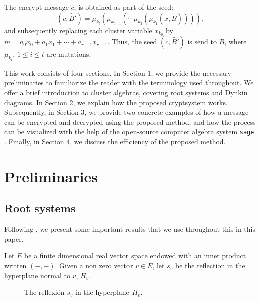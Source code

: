 \documentclass[12pt,a4paper]{article}
\begin{document}
The encrypt message $\tilde{c}$, is obtained as part of the seed:
$$(\tilde{c},\tilde{B'})=\mu_{k_{t}}(\mu_{k_{t-1}}(\cdots \mu_{k_2}(\mu_{k_1}(\tilde{x},\tilde{B})))),$$ and subsequently replacing each cluster variable $x_{k_0}$ by $m= a_0x_0+a_1x_1 + \cdots + a_{r-1}x_{r-1}$. Thus, the seed $(\tilde{c},\tilde{B'})$ is send to $B$, where $\mu_{k_i}$, $1\le i\le t$ are mutations.



This work consists of four sections. In Section 1, we provide the necessary preliminaries to familiarize the reader with the terminology used throughout. We offer a brief introduction to cluster algebras, covering root systems and Dynkin diagrams. In Section 2, we explain how the proposed cryptsystem works. Subsequently, in Section 3, we provide two concrete examples of how a message can be encrypted and decrypted using the proposed method, and how the process can be visualized with the help of the open-source computer
algebra system \verb"sage" \cite{Sage}. Finally, in Section 4, we discuss the efficiency of the proposed method.











\section{Preliminaries}

\subsection{Root systems}

Following \cite{algebralie}, we present some important results  that we  use  throughout this in this paper.

Let $E$ be a finite dimensional real vector space endowed with an inner product written $(-,-)$. Given a non zero vector $v \in E$, let $s_v$ be the reflection 
in the hyperplane normal to $v$, $H_v$.

\begin{figure}[h!]
\centering
{}
\caption{The reflexión $s_v$ in the  hyperplane  \(H_v\).}
\label{fig:reflexion}
\end{figure}
\end{document}
